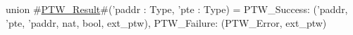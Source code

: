 union #\hyperref[sailRISCVzPTWzyResult]{PTW\_Result}#('paddr : Type, 'pte : Type) = {
  PTW_Success: ('paddr, 'pte, 'paddr, nat, bool, ext_ptw),
  PTW_Failure: (PTW_Error, ext_ptw)
}
